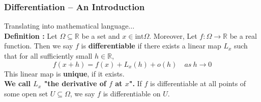 \documentclass{beamer}
\begin{document}
\begin{frame}
    \frametitle{Differentiation -- An Introduction}
    Translating into mathematical language...\\
    \vspace{2em}
    \textbf{Definition : }
    Let $\Omega\subseteq\mathbb{R}$ be a set and $x\in \text{int}\Omega$. Moreover, Let $f:\Omega\rightarrow \mathbb{R}$ be a real function.
    Then we say $f$ is \textbf{differentiable} if there exists a linear map $L_x$ such that for all sufficiently small $h\in\mathbb{R}$,
    \begin{equation*}
        f(x+h)=f(x)+L_x(h)+o(h)\quad as\ h\rightarrow 0
    \end{equation*}
    This linear map is \textbf{unique}, if it exists. \\
    \vspace{1em}
    \textbf{We call $L_x$ "the derivative of $f$ at $x$".}
    If $f$ is differentiable at all points of some open
    set $U\subseteq \Omega$, we say $f$ is differentiable on $U$.

\end{frame}
\end{document}
